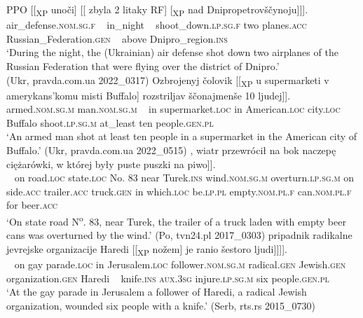 \documentclass[output=paper]{langscibook}
\begin{document}
\ea%
    \label{ex:junghanns:31}
\gll PPO [[\textsubscript{XP} unoči] [[ zbyla 2 litaky RF] [\textsubscript{XP} nad  Dnipropetrovščynoju]]].\\
  air\_defense.\textsc{nom.sg.f} ~ in\_night ~ shoot\_down.\textsc{lp.sg.f} two planes.\textsc{acc} Russian\_Federation.\textsc{gen} ~ above Dnipro\_region.\textsc{ins}\\
    \glt ‘During the night, the (Ukrainian) air defense shot down two airplanes of the Russian Federation that were flying over the district of Dnipro.’ \\ \hfill(Ukr, pravda.com.ua 2022\_0317)
\ex%
    \label{ex:junghanns:32}
\gll Ozbrojenyj čolovik [[\textsubscript{XP} u supermarketi v amerykans'komu misti Buffalo] \minsp{[} rozstriljav ščonajmenše 10 ljudej]].\\
  armed.\textsc{nom.sg.m} man.\textsc{nom.sg.m} ~ in supermarket.\textsc{loc} in American.\textsc{loc} city.\textsc{loc} Buffalo {} shoot.\textsc{lp.sg.m} at\_least ten people.\textsc{gen.pl}\\
    \glt ‘An armed man shot at least ten people in a supermarket in the American city of Buffalo.’ \hfill(Ukr, pravda.com.ua 2022\_0515)
\ex%
    \label{ex:junghanns:33}
\gll [[\textsubscript{XP} Na drodze krajowej nr 83, pod Turkiem], \minsp{[} wiatr przewrócił na bok naczepę ciężarówki, w której były puste puszki na piwo]].\\
  ~ on road.\textsc{loc} state.\textsc{loc} No. 83 near Turek.\textsc{ins} {} wind.\textsc{nom.sg.m} overturn.\textsc{lp.sg.m} on side.\textsc{acc} trailer.\textsc{acc} truck.\textsc{gen} in which.\textsc{loc} be.\textsc{lp.pl} empty.\textsc{nom.pl.f} can.\textsc{nom.pl.f} for beer.\textsc{acc}\\
    \glt ‘On state road N\textsuperscript{o}. 83, near Turek, the trailer of a truck laden with empty beer cans was overturned by the wind.’ \hfill (Po, tvn24.pl 2017\_0303)
\ex%
    \label{ex:junghanns:34}
\gll [[\textsubscript{XP} Na gaj paradi u Jerusalimu] \minsp{[} pripadnik radikalne jevrejske organizacije Haredi [[\textsubscript{XP} nožem] \minsp{[} je ranio šestoro ljudi]]]].\\
  ~  on gay parade.\textsc{loc} in Jerusalem.\textsc{loc} {} follower.\textsc{nom.sg.m} radical.\textsc{gen} Jewish.\textsc{gen} organization.\textsc{gen} Haredi ~ knife.\textsc{ins} {} \textsc{aux}.\textsc{3sg} injure.\textsc{lp.sg.m} six people.\textsc{gen.pl}\\
    \glt ‘At the gay parade in Jerusalem a follower of Haredi, a radical Jewish organization, wounded six people with a knife.’ \hfill (Serb, rts.rs 2015\_0730)
\z
\end{document}
